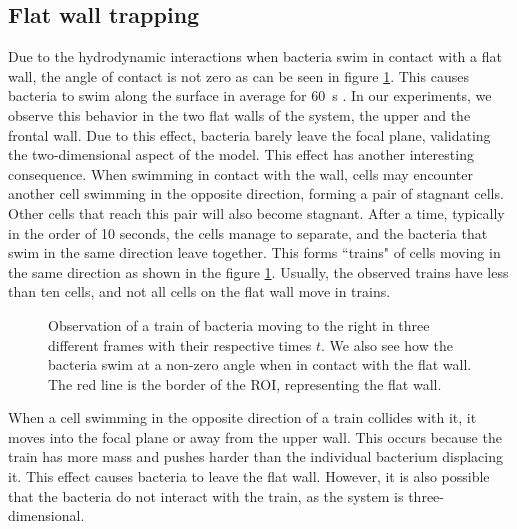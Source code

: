 \label{section:cell trapping}
\subsection{Flat wall trapping}

Due to the hydrodynamic interactions when bacteria swim in contact with a flat wall, the angle of contact is not zero \cite{Sipos2015HydrodynamicWalls} as can be seen in figure \ref{trains}. This causes bacteria to swim along the surface in average for \SI{60}{\second} \cite{Drescher2011FluidScattering}. In our experiments, we observe this behavior in the two flat walls of the system, the upper and the frontal wall. Due to this effect, bacteria barely leave the focal plane, validating the two-dimensional aspect of the model. This effect has another interesting consequence. When swimming in contact with the wall, cells may encounter another cell swimming in the opposite direction, forming a pair of stagnant cells. Other cells that reach this pair will also become stagnant. After a time, typically in the order of 10 seconds, the cells manage to separate, and the bacteria that swim in the same direction leave together. This forms ``trains" of cells moving in the same direction as shown in the figure \ref{trains}. Usually, the observed trains have less than ten cells, and not all cells on the flat wall move in trains. 

 
\begin{figure}
\centering

\caption[Observation of a train of bacteria swimming in the same direction]{Observation of a train of bacteria moving to the right in three different frames with their respective times $t$. We also see how the bacteria swim at a non-zero angle when in contact with the flat wall. The red line is the border of the ROI, representing the flat wall.}
\vspace{-50pt}
\label{trains}
\end{figure}

When a cell swimming in the opposite direction of a train collides with it, it moves into the focal plane or away from the upper wall. This occurs because the train has more mass and pushes harder than the individual bacterium displacing it. This effect causes bacteria to leave the flat wall. However, it is also possible that the bacteria do not interact with the train, as the system is three-dimensional.


